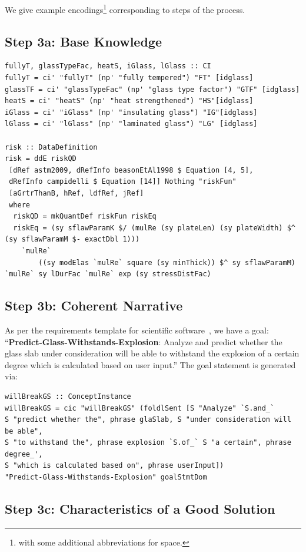 \documentclass[sigconf,review,anonymous=false]{acmart}
\begin{document}
We give example encodings\footnote{with some additional abbreviations 
for space.}
corresponding to steps of the process.
\subsection*{Step 3a: Base Knowledge}

\begin{lstlisting}
fullyT, glassTypeFac, heatS, iGlass, lGlass :: CI
fullyT = ci' "fullyT" (np' "fully tempered") "FT" [idglass]
glassTF = ci' "glassTypeFac" (np' "glass type factor") "GTF" [idglass]
heatS = ci' "heatS" (np' "heat strengthened") "HS"[idglass]
iGlass = ci' "iGlass" (np' "insulating glass") "IG"[idglass]
lGlass = ci' "lGlass" (np' "laminated glass") "LG" [idglass]

risk :: DataDefinition
risk = ddE riskQD
 [dRef astm2009, dRefInfo beasonEtAl1998 $ Equation [4, 5],
 dRefInfo campidelli $ Equation [14]] Nothing "riskFun" 
 [aGrtrThanB, hRef, ldfRef, jRef]
 where 
  riskQD = mkQuantDef riskFun riskEq
  riskEq = (sy sflawParamK $/ (mulRe (sy plateLen) (sy plateWidth) $^ (sy sflawParamM $- exactDbl 1))) 
    `mulRe`
        ((sy modElas `mulRe` square (sy minThick)) $^ sy sflawParamM) `mulRe` sy lDurFac `mulRe` exp (sy stressDistFac)
\end{lstlisting}

\subsection*{Step 3b: Coherent Narrative}

As per the requirements template for scientific software~\cite{SmithAndLai2005,
SmithEtAl2007}, we have a goal: ``\textbf{Predict-Glass-Withstands-Explosion}: Analyze and predict whether the glass slab
under consideration will be able to withstand the explosion of a certain degree
which is calculated based on user input.'' The goal statement is generated via:

\begin{lstlisting}
willBreakGS :: ConceptInstance
willBreakGS = cic "willBreakGS" (foldlSent [S "Analyze" `S.and_`
S "predict whether the", phrase glaSlab, S "under consideration will be able",
S "to withstand the", phrase explosion `S.of_` S "a certain", phrase degree_',
S "which is calculated based on", phrase userInput])
"Predict-Glass-Withstands-Explosion" goalStmtDom
\end{lstlisting}

\subsection*{Step 3c: Characteristics of a Good Solution}
\end{document}
